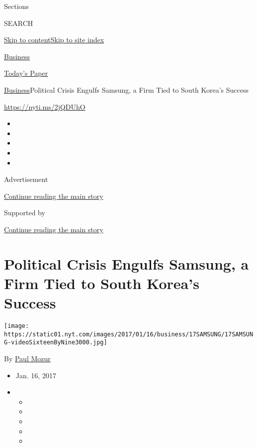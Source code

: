 Sections

SEARCH

\protect\hyperlink{site-content}{Skip to
content}\protect\hyperlink{site-index}{Skip to site index}

\href{https://www.nytimes.com/section/business}{Business}

\href{https://myaccount.nytimes.com/auth/login?response_type=cookie\&client_id=vi}{}

\href{https://www.nytimes.com/section/todayspaper}{Today's Paper}

\href{/section/business}{Business}\textbar{}Political Crisis Engulfs
Samsung, a Firm Tied to South Korea's Success

\url{https://nyti.ms/2jQDUhO}

\begin{itemize}
\item
\item
\item
\item
\item
\end{itemize}

Advertisement

\protect\hyperlink{after-top}{Continue reading the main story}

Supported by

\protect\hyperlink{after-sponsor}{Continue reading the main story}

\hypertarget{political-crisis-engulfs-samsung-a-firm-tied-to-south-koreas-success}{%
\section{Political Crisis Engulfs Samsung, a Firm Tied to South Korea's
Success}\label{political-crisis-engulfs-samsung-a-firm-tied-to-south-koreas-success}}

\texttt{[image: https://static01.nyt.com/images/2017/01/16/business/17SAMSUNG/17SAMSUNG-videoSixteenByNine3000.jpg]}

By \href{https://www.nytimes.com/by/paul-mozur}{Paul Mozur}

\begin{itemize}
\item
  Jan. 16, 2017
\item
  \begin{itemize}
  \item
  \item
  \item
  \item
  \item
  \end{itemize}
\end{itemize}

